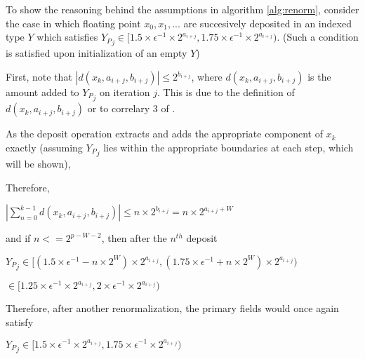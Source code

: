 \documentclass[12pt]{article}
\theoremstyle{plain}
\begin{document}
    To show the reasoning behind the assumptions in algorithm \ref{alg:renorm}, consider the case in which floating point $x_0, x_1, ...$ are succesively deposited in an indexed type $Y$ which satisfies ${Y_P}_j \in [1.5 \times \epsilon^{-1}\times 2^{a_{i + j}}, 1.75 \times \epsilon^{-1}\times 2^{a_{i + j}})$. (Such a condition is satisfied upon initialization of an empty $Y$)

    First, note that $|d(x_k, a_{i + j}, b_{i + j})| \leq 2^{b_{i + j}}$, where $d(x_k, a_{i + j}, b_{i + j})$ is the amount added to ${Y_P}_j$ on iteration $j$. This is due to the definition of $d(x_k, a_{i+j}, b_{i + j})$ or to correlary 3 of \cite{repsum}.

    As the deposit operation extracts and adds the appropriate component of $x_k$ exactly (assuming ${Y_P}_j$ lies within the appropriate boundaries at each step, which will be shown),

    Therefore,

    $|\sum \limits_{n = 0}^{k - 1} d(x_k, a_{i + j}, b_{i + j})| \leq n \times 2^{b_{i + j}} = n \times 2^{a_{i + j} + W}$

    and if $n <= 2^{p - W - 2}$, then after the $n^{th}$ deposit

    ${Y_P}_j \in [(1.5 \times \epsilon^{-1} - n \times 2^W)\times 2^{a_{i + j}}, (1.75 \times \epsilon^{-1} + n \times 2^W)\times 2^{a_{i + j}})$

    \indent\indent$\in [1.25 \times \epsilon^{-1}\times 2^{a_{i + j}}, 2 \times \epsilon^{-1}\times 2^{a_{i + j}})$

    Therefore, after another renormalization, the primary fields would once again satisfy

    ${Y_P}_j \in [1.5 \times \epsilon^{-1}\times 2^{a_{i + j}}, 1.75 \times \epsilon^{-1}\times 2^{a_{i + j}})$
\end{document}
